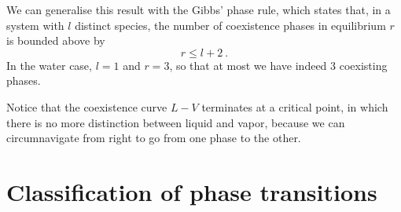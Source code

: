     We can generalise this result with the Gibbs' phase rule, which states that, in a system with $l$ distinct species, the number of coexistence phases in equilibrium $r$ is bounded above by 
    \begin{equation*}
        r \leq l + 2 ~.
    \end{equation*} 
    In the water case, $l = 1$ and $r = 3$, so that at most we have indeed $3$ coexisting phases.

    Notice that the coexistence curve $L-V$ terminates at a critical point, in which there is no more distinction between liquid and vapor, because we can circumnavigate from right to go from one phase to the other.

\section{Classification of phase transitions}

